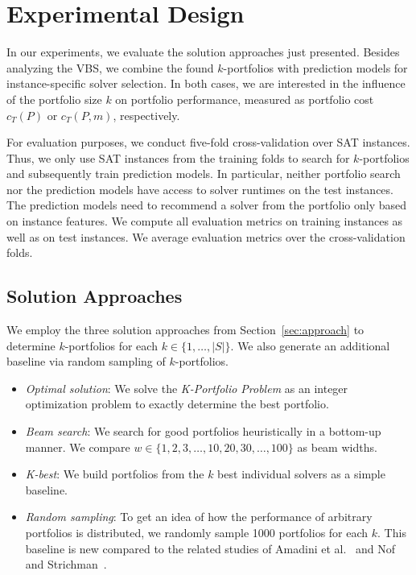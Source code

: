 \documentclass[a4paper,USenglish,pdfa]{lipics-v2021} %
\begin{document}
\section{Experimental Design}
\label{sec:experimental-design}

In our experiments, we evaluate the solution approaches just presented.
Besides analyzing the VBS, we combine the found $k$-portfolios with prediction models for instance-specific solver selection. 
In both cases, we are interested in the influence of the portfolio size $k$ on portfolio performance, measured as portfolio cost $c_T(P)$ or $c_T(P,m)$, respectively. 

For evaluation purposes, we conduct five-fold cross-validation over SAT instances.
Thus, we only use SAT instances from the training folds to search for $k$-portfolios and subsequently train prediction models.
In particular, neither portfolio search nor the prediction models have access to solver runtimes on the test instances.
The prediction models need to recommend a solver from the portfolio only based on instance features.
We compute all evaluation metrics on training instances as well as on test instances.
We average evaluation metrics over the cross-validation folds.

\subsection{Solution Approaches}

We employ the three solution approaches from Section~\ref{sec:approach} to determine $k$-portfolios for each $k \in \{1, \dots, |S|\}$. 
We also generate an additional baseline via random sampling of $k$-portfolios.

\begin{itemize}
	\item \emph{Optimal solution}:
	We solve the \emph{K-Portfolio Problem} as an integer optimization problem to exactly determine the best portfolio.
	\item \emph{Beam search}: 
	We search for good portfolios heuristically in a bottom-up manner.
	We compare $w \in \{1, 2, 3, \dots, 10, 20, 30, \dots, 100\}$ as beam widths.
	\item \emph{K-best}:
	We build portfolios from the $k$ best individual solvers as a simple baseline.
	\item \emph{Random sampling}:
	To get an idea of how the performance of arbitrary portfolios is distributed, we randomly sample 1000 portfolios for each $k$.
	This baseline is new compared to the related studies of Amadini et al.~\cite{amadini2014empirical,amadini2016extensive} and Nof and Strichman~\cite{nof2020real}.
\end{itemize}
\end{document}
